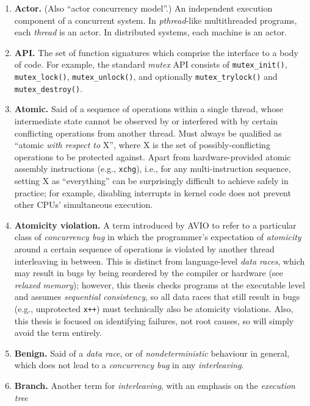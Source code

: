 \begin{enumerate}
	\item {\bf Actor.}
		(Also ``actor concurrency model''.)
		An independent execution component of a concurrent system.
		In {\em pthread}-like multithreaded programs, each {\em thread} is an actor.
		In distributed systems, each machine is an actor.
	\item {\bf API.}
		The set of function signatures which comprise the interface to a body of code.
		For example, the standard {\em mutex} API consists of
		{\tt mutex\_init()}, {\tt mutex\_lock()}, {\tt mutex\_unlock()},
		and optionally {\tt mutex\_trylock()} and {\tt mutex\_destroy()}.
	\item {\bf Atomic.}
		Said of a sequence of operations within a single thread,
		whose intermediate state cannot be observed by or interfered with
		by certain conflicting operations from another thread.
		Must always be qualified as ``atomic {\em with respect to} X'',
		where X is the set of possibly-conflicting operations to be protected against.
		Apart from hardware-provided atomic assembly instructions (e.g., {\tt xchg}),
		i.e., for any multi-instruction sequence,
		setting X as ``everything'' can be surprisingly difficult to achieve safely in practice;
		for example, disabling interrupts in kernel code does not prevent other CPUs' simultaneous execution.
	\item {\bf Atomicity violation.}
		A term introduced by AVIO \cite{avio} to refer to a particular class of {\em concurrency bug}
		in which the programmer's expectation of {\em atomicity} around a certain sequence of operations
		is violated by another thread interleaving in between.
		This is distinct from language-level {\em data races},
		which may result in bugs by being reordered by the compiler or hardware (see {\em relaxed memory});
		however, this thesis checks programs at the executable level and assumes {\em sequential consistency},
		so all data races that still result in bugs (e.g., unprotected {\tt x++})
		must technically also be atomicity violations.
		Also, this thesis is focused on identifying failures, not root causes,
		so will simply avoid the term entirely.
	\item {\bf Benign.}
		Said of a {\em data race}, or of {\em nondeterministic} behaviour in general,
		which does not lead to a {\em concurrency bug} in any {\em interleaving}.
	\item {\bf Branch.}
		Another term for {\em interleaving}, with an emphasis on the {\em execution tree}

\end{enumerate}

